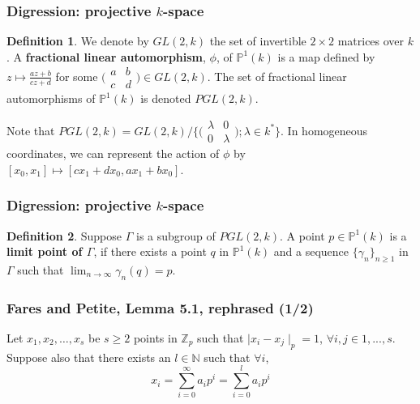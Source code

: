 \documentclass{beamer}
\theoremstyle{definition}
\newtheorem*{definition*}{Definition}
\begin{document}
\begin{frame}
\frametitle{Digression: projective $k$-space}
\begin{definition*}
	We denote by $GL(2,k)$ the set of invertible $2 \times 2$ matrices over $k$. A \textbf{fractional linear automorphism}, $\phi$, of $\mathbb{P}^1(k)$ is a map  defined by $z \mapsto \frac{az +b}{cz +d}$ for some 
	$\bigl( \begin{smallmatrix}a & b\\ c &d\end{smallmatrix}\bigr) \in GL(2,k)$. The set of fractional linear automorphisms of $\mathbb{P}^1(k)$ is denoted $PGL(2,k)$.
\parskip=20pt

 Note that $PGL(2,k) = GL(2,k) / \{ \bigl( \begin{smallmatrix}\lambda & 0\\ 0 &\lambda \end{smallmatrix}\bigr); \lambda \in k^*  \}$. In homogeneous coordinates, we can represent the action of $\phi$ by $[x_0,x_1] \mapsto [cx_1 +dx_0, ax_1 +bx_0]$. 
\end{definition*}
\end{frame}

\begin{frame}
\frametitle{Digression: projective $k$-space}
\begin{definition*}
	Suppose $\Gamma$ is a subgroup of $PGL(2,k)$. A point $p  \in \mathbb{P}^1(k)$ is a \textbf{limit point of $\Gamma$}, if there exists a point $q$ in  $\mathbb{P}^1(k)$ and a sequence $\{\gamma_n\}_{n\geq 1}$ in $\Gamma$ such that $\lim_{n\to\infty} \gamma_n(q) = p$.
\end{definition*}

\end{frame}

\begin{frame}
\frametitle{Fares and Petite, Lemma 5.1, rephrased (1/2)}
 Let $x_1,x_2,\ldots,x_s$ be $s \geq 2$ points in $\mathbb{Z}_p$ such that $\mid x_i - x_j \mid_p = 1$, $\forall i,j \in 1,...,s$. Suppose also that there exists an $l \in \mathbb{N}$ such that  $\forall i$, $$x_i = \sum_{i=0}^{\infty} a_ip^i = \sum_{i=0}^{l} a_ip^i $$
\end{frame}
\end{document}
